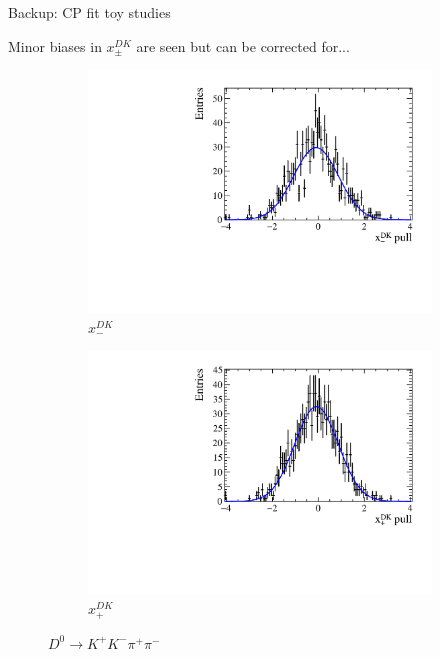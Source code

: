 \documentclass[xcolor={dvipsnames}]{beamer}
\begin{document}
\begin{frame}{Backup: CP fit toy studies}
  \begin{center}
    Minor biases in $x_\pm^{DK}$ are seen but can be corrected for...
  \end{center}
  \begin{figure}
    \centering
    \begin{subfigure}{0.5\textwidth}
      \centering
      \includegraphics[width=1.0\textwidth]{Plots/A_xm_dk_pull.pdf}
      \vspace{-0.3cm}
      \caption*{$x_-^{DK}$}
    \end{subfigure}%
    \begin{subfigure}{0.5\textwidth}
      \centering
      \includegraphics[width=1.0\textwidth]{Plots/A_xp_dk_pull.pdf}
      \vspace{-0.3cm}
      \caption*{$x_+^{DK}$}
    \end{subfigure}
    \caption*{$D^0\to K^+K^-\pi^+\pi^-$}
  \end{figure}
\end{frame}
\end{document}
